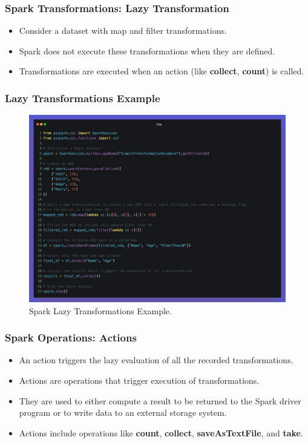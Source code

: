 \begin{frame}
    \frametitle{Spark Transformations: Lazy Transformation}
    \begin{itemize}
        \item Consider a dataset with map and filter transformations.
        \item Spark does not execute these transformations when they are defined.
        \item Transformations are executed when an action (like \textbf{collect}, \textbf{count}) is called.
    \end{itemize}
\end{frame}
\begin{frame}
    \frametitle{Lazy Transformations Example}
    \begin{figure}
        \includegraphics[width=\textwidth,height=.75\textheight,keepaspectratio]{./Figures/chapter-04/pyspark_transformations}
        \caption{Spark Lazy Transformations Example.}\label{fig:pyspark_transformations}
    \end{figure}
\end{frame}
\begin{frame}
    \frametitle{Spark Operations: Actions}
    \begin{itemize}
        \item An action triggers the lazy evaluation of all the recorded transformations.
        \item Actions are operations that trigger execution of transformations.
        \item They are used to either compute a result to be returned to the Spark driver program or to write data to an external storage system.
        \item Actions include operations like \textbf{count}, \textbf{collect}, \textbf{saveAsTextFile}, and \textbf{take}.
    \end{itemize}
\end{frame}

